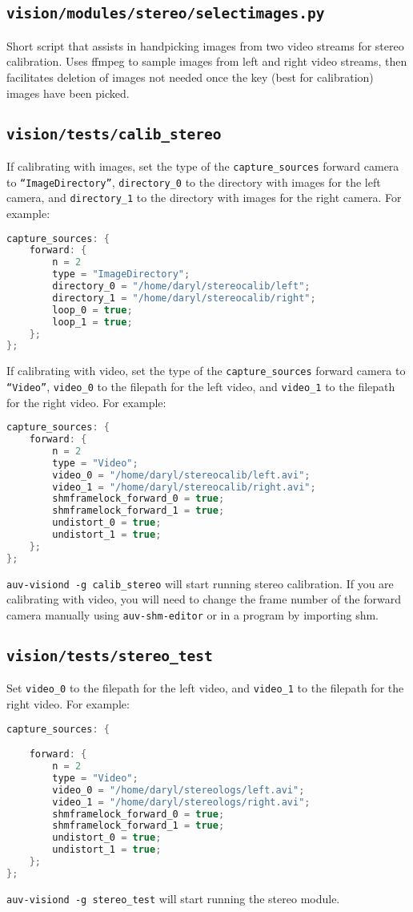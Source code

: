 \documentclass[11pt]{article}
\begin{document}
    \subsection{\texttt{vision/modules/stereo/selectimages.py}}
    Short script that assists in handpicking images from two video streams for stereo calibration. Uses ffmpeg to sample images from left and right video streams, then facilitates deletion of images not needed once the key (best for calibration) images have been picked.
    \subsection{\texttt{vision/tests/calib\_stereo}}
    \label{subsec:calibstereo}
    If calibrating with images, set the type of the \texttt{capture\_sources} forward camera to \texttt{``ImageDirectory''}, \texttt{directory\_0} to the directory with images for the left camera, and \texttt{directory\_1} to the directory with images for the right camera. For example: 
    \begin{lstlisting}[language=C++]
capture_sources: {
    forward: {
        n = 2
        type = "ImageDirectory";
        directory_0 = "/home/daryl/stereocalib/left";
        directory_1 = "/home/daryl/stereocalib/right";
        loop_0 = true;
        loop_1 = true;
    };
};
\end{lstlisting}
If calibrating with video, set the type of the \texttt{capture\_sources} forward camera to \texttt{``Video''}, \texttt{video\_0} to the filepath for the left video, and \texttt{video\_1} to the filepath for the right video. For example: 
\begin{lstlisting}[language=C++]
capture_sources: {
    forward: {
        n = 2
        type = "Video";
        video_0 = "/home/daryl/stereocalib/left.avi";
        video_1 = "/home/daryl/stereocalib/right.avi";
        shmframelock_forward_0 = true;
        shmframelock_forward_1 = true;
        undistort_0 = true;
        undistort_1 = true;
    };
};
\end{lstlisting}
\texttt{auv-visiond -g calib\_stereo} will start running stereo calibration. If you are calibrating with video, you will need to change the frame number of the forward camera manually using \texttt{auv-shm-editor} or in a program by importing shm.

    \subsection{\texttt{vision/tests/stereo\_test}}
    Set \texttt{video\_0} to the filepath for the left video, and \texttt{video\_1} to the filepath for the right video. For example: 
    \begin{lstlisting}[language=C++]
capture_sources: {

    forward: {
        n = 2
        type = "Video";
        video_0 = "/home/daryl/stereologs/left.avi";
        video_1 = "/home/daryl/stereologs/right.avi";
        shmframelock_forward_0 = true;
        shmframelock_forward_1 = true;
        undistort_0 = true;
        undistort_1 = true;
    };
};
\end{lstlisting}
\texttt{auv-visiond -g stereo\_test} will start running the stereo module.
\end{document}
